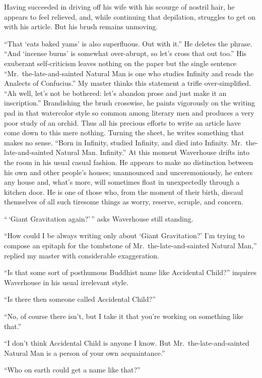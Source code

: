 \documentclass[12pt, openright]{book}
\begin{document}
Having succeeded in driving off his wife with his scourge of nostril
hair, he appears to feel relieved, and, while continuing that
depilation, struggles to get on with his article. But his brush remains
unmoving.

``That `eats baked yams' is also superfluous. Out with it.'' He deletes
the phrase. ``And `incense burns' is somewhat over-abrupt, so let's
cross that out too.'' His exuberant self-criticism leaves nothing on the
paper but the single sentence ``Mr.~the-late-and-sainted Natural Man is
one who studies Infinity and reads the Analects of Confucius.'' My
master thinks this statement a trifle over-simplified. ``Ah well, let's
not be bothered: let's abandon prose and just make it an inscription.''
Brandishing the brush crosswise, he paints vigorously on the writing pad
in that watercolor style so common among literary men and produces a
very poor study of an orchid. Thus all his precious efforts to write an
article have come down to this mere nothing. Turning the sheet, he
writes something that makes no sense. ``Born in Infinity, studied
Infinity, and died into Infinity. Mr.~the-late-and-sainted Natural Man.
Infinity.'' At this moment Waverhouse drifts into the room in his usual
casual fashion. He appears to make no distinction between his own and
other people's houses; unannounced and unceremoniously, he enters any
house and, what's more, will sometimes float in unexpectedly through a
kitchen door. He is one of those who, from the moment of their birth,
discaul themselves of all such tiresome things as worry, reserve,
scruple, and concern.

``\,`Giant Gravitation again?'\,'' asks Waverhouse still standing.

``How could I be always writing only about `Giant Gravitation?' I'm
trying to compose an epitaph for the tombstone of
Mr.~the-late-and-sainted Natural Man,'' replied my master with
considerable exaggeration.

``Is that some sort of posthumous Buddhist name like Accidental Child?''
inquires Waverhouse in his usual irrelevant style.

``Is there then someone called Accidental Child?''

``No, of course there isn't, but I take it that you're working on
something like that.''

``I don't think Accidental Child is anyone I know. But
Mr.~the-late-and-sainted Natural Man is a person of your own
acquaintance.''

``Who on earth could get a name like that?''
\end{document}
